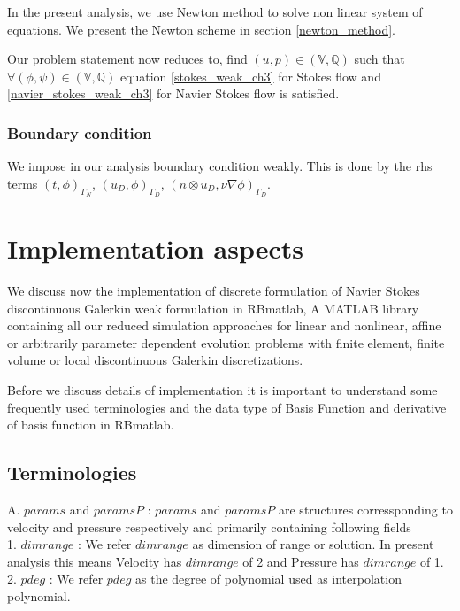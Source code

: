 \documentclass[a4paper,12pt]{book}
\begin{document}
In the present analysis, we use Newton method to solve non linear system of equations. We present the Newton scheme in section \ref{newton_method}. 

Our problem statement now reduces to, find $(u,p) \in (\mathbb{V},\mathbb{Q})$ such that $\forall (\phi,\psi) \in (\mathbb{V},\mathbb{Q})$ equation \ref{stokes_weak_ch3} for Stokes flow and \ref{navier_stokes_weak_ch3} for Navier Stokes flow is satisfied.

\subsection{Boundary condition}

We impose in our analysis boundary condition weakly. This is done by the rhs terms $(t,\phi)_{\Gamma_N}$, $(u_D,\phi)_{\Gamma_D}$, $(n \otimes u_D, \nu \nabla \phi)_{\Gamma_D}$.

\chapter{Implementation aspects} \label{implementation_aspects}

We discuss now the implementation of discrete formulation of Navier Stokes discontinuous Galerkin weak formulation in RBmatlab, A MATLAB library containing all our reduced simulation approaches for linear and nonlinear, affine or arbitrarily parameter dependent evolution problems with finite element, finite volume or local discontinuous Galerkin discretizations. 

Before we discuss details of implementation it is important to understand some frequently used terminologies and the data type of Basis Function and derivative of basis function in RBmatlab.

\section{Terminologies}


A. $params$ and $paramsP$ : $params$ and $paramsP$ are structures corressponding to velocity and pressure respectively and primarily containing following fields\\

1. $dimrange$ : We refer $dimrange$ as dimension of range or solution. In present analysis this means Velocity has $dimrange$ of 2 and Pressure has $dimrange$ of 1.\\

2. $pdeg$ : We refer $pdeg$ as the degree of polynomial used as interpolation polynomial.\\
\end{document}
